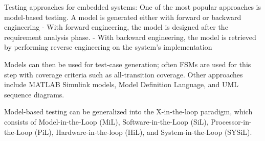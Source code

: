 Testing approaches for embedded systems:
One of the most popular approaches is model-based testing. A model is generated either with forward or backward engineering
	- With forward engineering, the model is designed after the requirement analysis phase.
	- With backward engineering, the model is retrieved by performing reverse engineering on the system's implementation

Models can then be used for test-case generation; often FSMs are used for this step with coverage criteria such as all-transition coverage. Other approaches include MATLAB Simulink models, Model Definition Language, and UML sequence diagrams.

Model-based testing can be generalized into the X-in-the-loop paradigm, which consists of Model-in-the-Loop (MiL), Software-in-the-Loop (SiL), Processor-in-the-Loop (PiL), Hardware-in-the-loop (HiL), and System-in-the-Loop (SYSiL).
